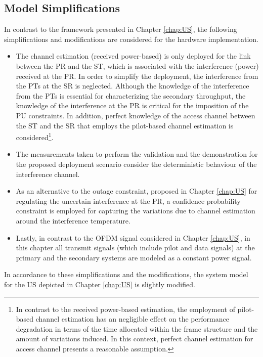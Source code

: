 \subsection{Model Simplifications}
\label{ssec:simp1}
In contrast to the framework presented in Chapter \ref{chap:US}, the following simplifications and modifications are considered for the hardware implementation.
\begin{itemize}
\item The channel estimation (received power-based) is only deployed for the link between the PR and the ST, which is associated with the interference (power) received at the PR. In order to simplify the deployment, the interference from the PTs at the SR is neglected. Although the knowledge of the interference from the PTs is essential for characterizing the secondary throughput, the knowledge of the interference at the PR is critical for the imposition of the PU constraints. In addition, perfect knowledge of the access channel between the ST and the SR that employs the pilot-based channel estimation is considered\footnote{In contrast to the received power-based estimation, the employment of pilot-based channel estimation has an negligible effect on the performance degradation in terms of the time allocated within the frame structure and the amount of variations induced. In this context, perfect channel estimation for access channel presents a reasonable assumption.}.  
\item The measurements taken to perform the validation and the demonstration for the proposed deployment scenario consider the deterministic behaviour of the interference channel.  
\item As an alternative to the outage constraint, proposed in Chapter \ref{chap:US} for regulating the uncertain interference at the PR, a confidence probability constraint is employed for capturing the variations due to channel estimation around the interference temperature. %
\item Lastly, in contrast to the OFDM signal considered in Chapter \ref{chap:US}, in this chapter all transmit signals (which include pilot and data signals) at the primary and the secondary systems are modeled as a constant power signal. 
\end{itemize}

In accordance to these simplifications and the modifications, the system model for the US depicted in Chapter \ref{chap:US} is slightly modified. 

